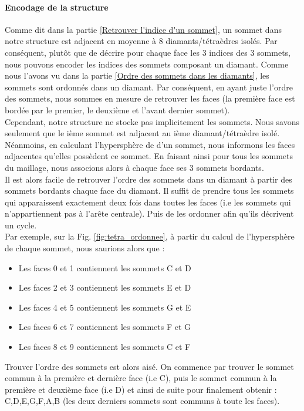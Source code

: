 \documentclass[a4paper,11pt,openany]{article}
\begin{document}
\paragraph{Encodage de la structure}
Comme dit dans la partie \ref{Retrouver l'indice d'un sommet}, un sommet dans notre structure est adjacent en moyenne à 8 diamants/tétraèdres isolés. Par conséquent, plutôt que de décrire pour chaque face les 3 indices des 3 sommets, nous pouvons encoder les indices des sommets composant un diamant. Comme nous l'avons vu dans la partie \ref{Ordre des sommets dans les diamants}, les sommets sont ordonnés dans un diamant. Par conséquent, en ayant juste l'ordre des sommets, nous sommes en mesure de retrouver les faces (la première face est bordée par le premier, le deuxième et l'avant dernier sommet).\\
Cependant, notre structure ne stocke pas implicitement les sommets. Nous savons seulement que le ième sommet est adjacent au ième diamant/tétraèdre isolé. Néanmoins, en calculant l'hypersphère de d'un sommet, nous informons les faces adjacentes qu'elles possèdent ce sommet. En faisant ainsi pour tous les sommets du maillage, nous associons alors à chaque face ses 3 sommets bordants.\\
Il est alors facile de retrouver l'ordre des sommets dans un diamant à partir des sommets bordants chaque face du diamant. Il suffit de prendre tous les sommets qui apparaissent exactement deux fois dans toutes les faces (i.e les sommets qui n'appartiennent pas à l'arête centrale). Puis de les ordonner afin qu'ils décrivent un cycle.\\
Par exemple, sur la Fig. \ref{fig:tetra_ordonnee}, à partir du calcul de l'hypersphère de chaque sommet, nous saurions alors que :
\begin{itemize}
\item Les faces 0 et 1 contiennent les sommets C et D
\item Les faces 2 et 3 contiennent les sommets E et D
\item Les faces 4 et 5 contiennent les sommets G et E
\item Les faces 6 et 7 contiennent les sommets F et G
\item Les faces 8 et 9 contiennent les sommets C et F
\end{itemize}
Trouver l'ordre des sommets est alors aisé. On commence par trouver le sommet commun à la première et dernière face (i.e C), puis le sommet commun à la première et deuxième face (i.e D) et ainsi de suite pour finalement obtenir : C,D,E,G,F,A,B (les deux derniers sommets sont communs à toute les faces).\\
\end{document}
